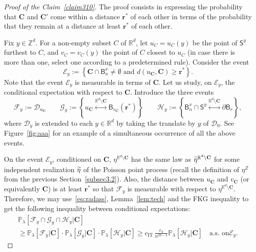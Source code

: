 \documentclass[10pt]{amsart}
\theoremstyle{definition}\newtheorem{defi}[theo]{Definition}\newtheorem{rema}[theo]{Remark}\newtheorem{exam}[theo]{Example}\newtheorem{exem}[theo]{Example}\newtheorem{nota}[theo]{Notation}
\newcommand{\rbf}{\mathbf{r}}
\newcommand{\Cbf}{\mathbf{C}}
\DeclareMathOperator{\IT}{IT}
\let\oldtilde\tilde
\renewcommand*{\tilde}[1]{\mathchoice{\widetilde{#1}}{\widetilde{#1}}{\oldtilde{#1}}{\oldtilde{#1}}}
\begin{document}
\begin{proof}[Proof of the Claim~\ref{claim310}]
The proof consists in expressing the probability that ${\Cbf}$ and ${\Cbf'}$ come within a distance ${\rbf^*}$ of each other in terms of the probability that they remain at a distance at least ${\rbf^*}$ of each other.

Fix $y\in{\mathbb Z}^d$. For a non-empty subset $C$ of ${\mathbb R}^d$, let $u_C=u_C(y)$ be the point of $\mathsf S^y$ furthest to $C$, and $v_C=v_C(y)$ the point of $C$ closest to $u_C$ (in case there is more than one, select one according to a predetermined rule). Consider the event
\[
{\mathcal E}_y:=\left\{{\Cbf}\cap\mathsf B^x_{n}\ne\emptyset\text{ and }d(u_{\Cbf},{\Cbf})\ge{\rbf^*}\right\}.
\]
Note that the event ${\mathcal E}_y$ is measurable in terms of ${\Cbf}$. Let us study, on ${\mathcal E}_y$, the conditional expectation with respect to ${\Cbf}$. Introduce the three events
\[
{\mathcal F}_y:={\mathcal D}_{u_{\Cbf}}
\qquad{\mathcal G}_y:=\left\{u_{\Cbf}\stackrel{{\mathbb R}^d\setminus{\Cbf}}{\longleftrightarrow}\mathsf B_{v_{\Cbf}}({\rbf^*})\right\}
\qquad{\mathcal H}_y:=\left\{\mathsf B^x_{n}\cap\mathsf S^y\stackrel{{\mathbb R}^d\setminus{\Cbf}}{\longleftrightarrow}\partial\mathsf B_r\right\},
\]
where ${\mathcal D}_y$ is extended to each $y\in{\mathbb R}^d$ by taking the translate by $y$ of ${\mathcal D}_0$. See Figure~\ref{fig:aaa} for an example of a simultaneous occurrence of all the above events.

On the event ${\mathcal E}_y$, conditioned on ${\Cbf}$, $\eta^{{\mathbb R}^d\setminus{\Cbf}}$ has the same law as $\tilde\eta^{{\mathbb R}^d\setminus {\Cbf}}$ for some independent realization $\tilde\eta$ of the Poisson point process (recall the definition of $\eta^Z$ from the previous Section~\ref{subsec3.2}). Also, the distance between $u_{\Cbf}$ and $v_{\Cbf}$ (or equivalently ${\Cbf}$) is at least ${\rbf^*}$ so that ${\mathcal F}_y$ is measurable with respect to $\eta^{{\mathbb R}^d\setminus{\Cbf}}$. Therefore, we may use~\eqref{eq:radass}, Lemma~\ref{lem:tech} and the FKG inequality to get the following inequality between conditional expectations:
\begin{multline}\label{eq:r}
{\mathbb P}_\lambda[{\mathcal F}_y\cap{\mathcal G}_y\cap{\mathcal H}_y|{\Cbf}] \\
\ge {\mathbb P}_\lambda[{\mathcal F}_y|{\Cbf}]\cdot {\mathbb P}_\lambda[{\mathcal G}_y|{\Cbf}]\cdot {\mathbb P}_\lambda[{\mathcal H}_y|{\Cbf}]\ge {c_{\IT}}\,\frac{c_4}{n^{2d-2}}{\mathbb P}_\lambda[{\mathcal H}_y|{\Cbf}]\quad\text{a.s. on}\mathcal E_y.
\end{multline}


\end{proof}
\end{document}
